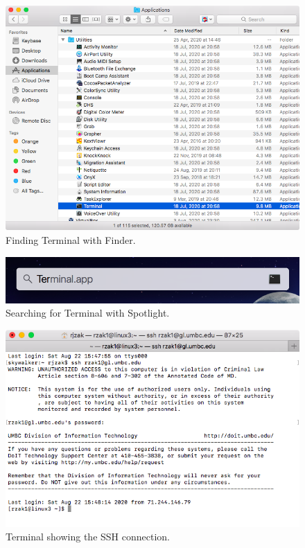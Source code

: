 \documentclass[letter,11pt]{article}
\begin{document}
\begin{figure}
\centering
\includegraphics[scale=0.6]{Images/finder_terminal.png}
\caption{Finding Terminal with Finder.}
\label{fig:macfinderterminal}
\end{figure}

\begin{figure}
\centering
\includegraphics[scale=0.6]{Images/spotlight_terminal.png}
\caption{Searching for Terminal with Spotlight.}
\label{fig:macspotlightterminal}
\end{figure}

\begin{figure}
\centering
\includegraphics[scale=0.6]{Images/macos_terminal_ssh.png}
\caption{Terminal showing the SSH connection.}
\label{fig:macterminalconnected}
\end{figure}
\end{document}
